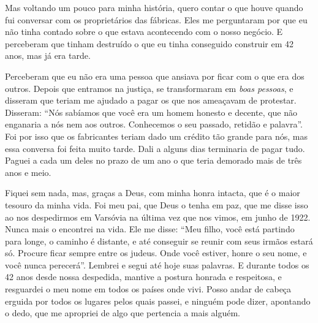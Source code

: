 Mas voltando um pouco para minha história, quero contar o que houve quando fui
conversar com os proprietários das fábricas. Eles me perguntaram por que
eu não tinha contado sobre o que estava acontecendo com o
nosso negócio. E perceberam que tinham destruído o que eu tinha
conseguido construir em 42 anos, mas já era tarde.

Perceberam que eu não era uma pessoa que ansiava por ficar com o que era
dos outros. Depois que entramos na justiça, se transformaram em \textit{boas pessoas}, e disseram que teriam me ajudado a pagar os
que nos ameaçavam de protestar. Disseram: ``Nós sabíamos que você era um
homem honesto e decente, que não enganaria a nós nem aos outros.
Conhecemos o seu passado, retidão e palavra''. Foi por isso que os fabricantes teriam dado um crédito tão grande para nós, mas essa
conversa foi feita muito tarde. Dali a alguns dias terminaria de pagar
tudo. Paguei a cada um deles no prazo de um ano o que teria demorado
mais de três anos e meio.

Fiquei sem nada, mas, graças a Deus, com minha honra intacta, que é
o maior tesouro da minha vida. Foi meu pai, que Deus o tenha em
paz, que me disse isso ao nos despedirmos em Varsóvia na última
vez que nos vimos, em junho de 1922. Nunca mais o encontrei na vida. Ele me disse: 
``Meu filho, você está partindo para longe, o caminho é distante, e até
conseguir se reunir com seus irmãos estará só. Procure ficar sempre
entre os judeus. Onde você estiver, honre o seu nome, e você nunca
perecerá''. Lembrei e segui até hoje suas palavras. E durante todos os 42 anos desde nossa despedida, mantive a
postura honrada e respeitosa, e resguardei o meu nome em todos os países
onde vivi. Posso andar de cabeça erguida por todos os lugares pelos quais 
passei, e ninguém pode dizer, apontando o dedo, que me apropriei de
algo que pertencia a mais alguém.
